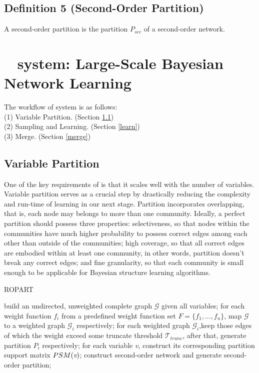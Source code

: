 \subsection{Definition 5 (Second-Order Partition)}
A second-order partition is the partition $P_{sec}$ of a second-order network.

\section{\lama~ system: Large-Scale Bayesian Network Learning}

The workflow of \lama{} system is as follows:\\
(1) Variable Partition. (Section \ref{partition})  \\
(2) Sampling and Learning. (Section \ref{learn}) \\
(3) Merge. (Section \ref{merge})

\subsection{Variable Partition}
\label{partition}

One of the key requirements of \lama{} is that it scales well with the number
of variables. Variable partition serves as a crucial step by drastically reducing the complexity and run-time of learning in our next stage. Partition incorporates overlapping, that is, each node may belongs to more than one community. Ideally, a perfect partition should possess three properties: selectiveness, so that nodes within the communities have much higher probability to possess correct edges among each other than outside of the communities; high coverage, so that all correct edges are embodied within at least one community, in other words, partition doesn't break any correct edges; and fine granularity, so that each community is small enough to be applicable for Bayesian structure learning algorithms.

\begin{algorithm}
\caption{ROPART}
\label{alg:partition}
\begin{algorithmic}[1]
\State build an undirected, unweighted complete graph $\mathcal{G}$ given all variables;
\State for each weight function $f_{i}$ from a predefined weight function set $F=\{f_{1},...,f_{n}\}$, map $\mathcal{G}$ to a weighted graph $\mathcal{G}_{i}$ respectively;
\State for each weighted graph $\mathcal{G}_{i}$,keep those edges of which the weight exceed some truncate threshold $\mathcal {T}_{trunc}$, after that, generate partition $P_{i}$ respectively;
\State for each variable \emph{v}, construct its corresponding partition support matrix $PSM(\emph{v})$;
\State construct second-order network and generate second-order partition;

\end{algorithmic}
\end{algorithm}

